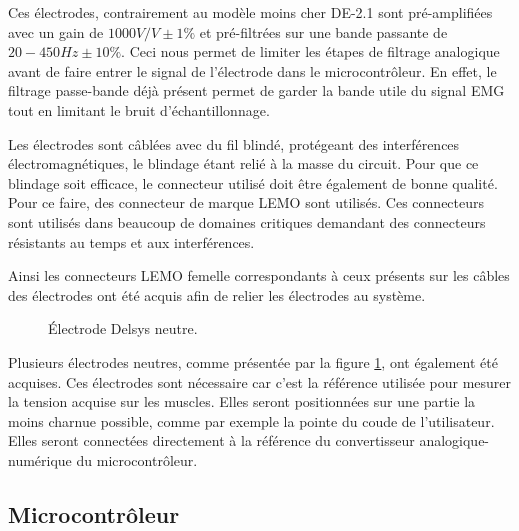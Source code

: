 \documentclass[letterpaper, twoside, 12pt, memoire, creativecommons, hyperref]{thETS}
\begin{document}
Ces électrodes, contrairement au modèle moins cher DE-2.1 sont pré-amplifiées avec un gain de $1000 V/V \pm 1\%$ et pré-filtrées sur une bande passante de $20-450 Hz \pm 10\%$. Ceci nous permet de limiter les étapes de filtrage analogique avant de faire entrer le signal de l'électrode dans le microcontrôleur. En effet, le filtrage passe-bande déjà présent permet de garder la bande utile du signal EMG tout en limitant le bruit d'échantillonnage.

Les électrodes sont câblées avec du fil blindé, protégeant des interférences électromagnétiques, le blindage étant relié à la masse du circuit. Pour que ce blindage soit efficace, le connecteur utilisé doit être également de bonne qualité. Pour ce faire, des connecteur de marque LEMO sont utilisés. Ces connecteurs sont utilisés dans beaucoup de domaines critiques demandant des connecteurs résistants au temps et aux interférences. 

Ainsi les connecteurs LEMO femelle correspondants à ceux présents sur les câbles des électrodes ont été acquis afin de relier les électrodes au système.

\begin{figure}
	\centering
	\caption{Électrode Delsys neutre.}
	\label{fig:delsysneutre}
\end{figure}

Plusieurs électrodes neutres, comme présentée par la figure \ref{fig:delsysneutre}, ont également été acquises. Ces électrodes sont nécessaire car c'est la référence utilisée pour mesurer la tension acquise sur les muscles. Elles seront positionnées sur une partie la moins charnue possible, comme par exemple la pointe du coude de l'utilisateur. Elles seront connectées directement à la référence du convertisseur analogique-numérique du microcontrôleur.

\subsection{Microcontrôleur}\label{ch:microcon}
\end{document}
